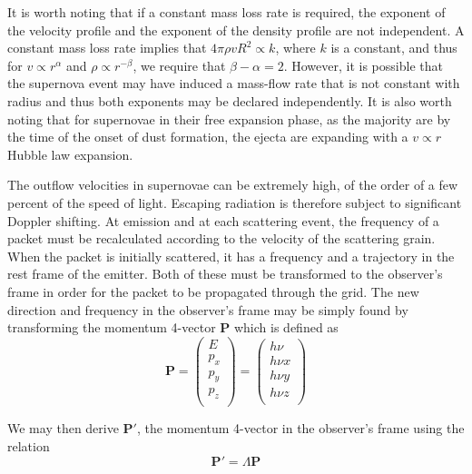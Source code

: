 It is worth noting that if a constant mass loss rate is required, the exponent of the velocity profile and the exponent of the density profile are not independent.  A constant mass loss rate implies that $4\pi \rho vR^2  \propto k$, where $k$ is a constant, and thus for $v \propto r^\alpha$ and $\rho\propto r^{-\beta}$, we require that $\beta-\alpha=2$.  However, it is possible that the supernova event may have induced a mass-flow rate that is not constant with radius and thus both exponents may be declared independently.  It is also worth noting that for supernovae in their free expansion phase, as the majority are by the time of the onset of dust formation, the ejecta are expanding with a $v \propto r$ Hubble law expansion.

The outflow velocities in supernovae can be extremely high, of the order of a few percent of the speed of light.  Escaping radiation is therefore subject to significant Doppler shifting. At emission and at each scattering event, the frequency of a packet must be recalculated according to the velocity of the scattering grain.  When the packet is initially scattered, it has a frequency and a trajectory in the rest frame of the emitter. Both of these must be transformed to the observer's frame in order for the packet to be propagated through the grid.  The new direction and frequency in the observer's frame may be simply found by transforming the momentum 4-vector $\boldsymbol{P}$ which is defined as
\begin{equation}
\boldsymbol{P}=
\begin{pmatrix}
E \\
p_x \\
p_y \\
p_z \\
\end{pmatrix} =
\begin{pmatrix}
h \nu \\
h \nu x \\
h \nu y \\
h \nu z \\
\end{pmatrix}
\end{equation}


\noindent We may then derive $\boldsymbol{P'}$, the momentum 4-vector in the observer's frame using the relation
\begin{equation}
\boldsymbol{P'}=\Lambda \boldsymbol{P}	
\end{equation}

